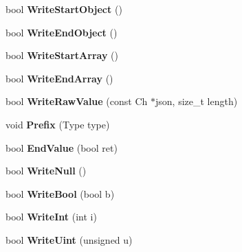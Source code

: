 \begin{DoxyCompactItemize}
\item 
bool {\bfseries Write\+Start\+Object} ()\hypertarget{class_writer_a81c72a2eecd47e042f56ca93a27a5cb1}{}\label{class_writer_a81c72a2eecd47e042f56ca93a27a5cb1}

\item 
bool {\bfseries Write\+End\+Object} ()\hypertarget{class_writer_a7e3f6760a50a72f4217a9b2d625c43ee}{}\label{class_writer_a7e3f6760a50a72f4217a9b2d625c43ee}

\item 
bool {\bfseries Write\+Start\+Array} ()\hypertarget{class_writer_a3c3560a96cac58f98f4a74d6cb227204}{}\label{class_writer_a3c3560a96cac58f98f4a74d6cb227204}

\item 
bool {\bfseries Write\+End\+Array} ()\hypertarget{class_writer_aabda2df1be6e83cef416e9b1f042e8f4}{}\label{class_writer_aabda2df1be6e83cef416e9b1f042e8f4}

\item 
bool {\bfseries Write\+Raw\+Value} (const Ch $\ast$json, size\+\_\+t length)\hypertarget{class_writer_a8ee1135b2595261819b134907f67614e}{}\label{class_writer_a8ee1135b2595261819b134907f67614e}

\item 
void {\bfseries Prefix} (Type type)\hypertarget{class_writer_a1fc40f8b9f3abc2548c0c5782ce1755d}{}\label{class_writer_a1fc40f8b9f3abc2548c0c5782ce1755d}

\item 
bool {\bfseries End\+Value} (bool ret)\hypertarget{class_writer_adc1cadbabc309d31f19cf7463251d879}{}\label{class_writer_adc1cadbabc309d31f19cf7463251d879}

\item 
bool {\bfseries Write\+Null} ()\hypertarget{class_writer_a44862b3eba8d84b909c69aba875c9f4d}{}\label{class_writer_a44862b3eba8d84b909c69aba875c9f4d}

\item 
bool {\bfseries Write\+Bool} (bool b)\hypertarget{class_writer_a42ad68b6950431bb8ca0199568546eaf}{}\label{class_writer_a42ad68b6950431bb8ca0199568546eaf}

\item 
bool {\bfseries Write\+Int} (int i)\hypertarget{class_writer_a31d0feda654ca245c41462be7dc59998}{}\label{class_writer_a31d0feda654ca245c41462be7dc59998}

\item 
bool {\bfseries Write\+Uint} (unsigned u)\hypertarget{class_writer_a2861227e93707d1478d2cf56644dca3b}{}\label{class_writer_a2861227e93707d1478d2cf56644dca3b}


\end{DoxyCompactItemize}
